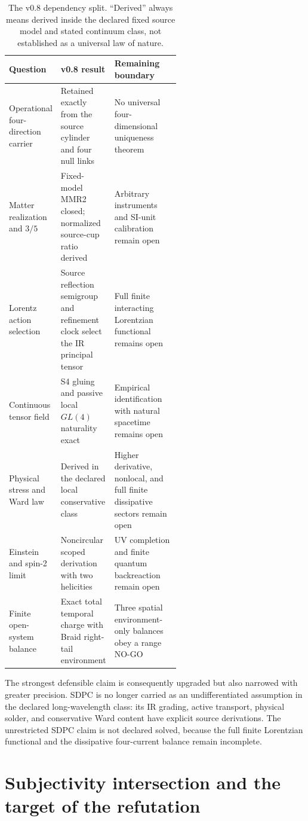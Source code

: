 \documentclass[11pt]{article}
\theoremstyle{definition}
\theoremstyle{remark}
\begin{document}
\begin{table}[ht]
\centering
\small
\begin{tabularx}{\linewidth}{>{\raggedright\arraybackslash}p{0.26\linewidth} >{\raggedright\arraybackslash}p{0.31\linewidth} X}
\toprule
Question & v0.8 result & Remaining boundary \\
\midrule
Operational four-direction carrier & Retained exactly from the source cylinder and four null links & No universal four-dimensional uniqueness theorem \\
Matter realization and $3/5$ & Fixed-model MMR2 closed; normalized source-cup ratio derived & Arbitrary instruments and SI-unit calibration remain open \\
Lorentz action selection & Source reflection semigroup and refinement clock select the IR principal tensor & Full finite interacting Lorentzian functional remains open \\
Continuous tensor field & S4 gluing and passive local $GL(4)$ naturality exact & Empirical identification with natural spacetime remains open \\
Physical stress and Ward law & Derived in the declared local conservative class & Higher derivative, nonlocal, and full finite dissipative sectors remain open \\
Einstein and spin-2 limit & Noncircular scoped derivation with two helicities & UV completion and finite quantum backreaction remain open \\
Finite open-system balance & Exact total temporal charge with Braid right-tail environment & Three spatial environment-only balances obey a range NO-GO \\
\bottomrule
\end{tabularx}
\caption{The v0.8 dependency split. ``Derived'' always means derived inside the declared fixed source model and stated continuum class, not established as a universal law of nature.}
\label{tab:delta}
\end{table}

The strongest defensible claim is consequently upgraded but also narrowed with greater precision. SDPC is no longer carried as an undifferentiated assumption in the declared long-wavelength class: its IR grading, active transport, physical solder, and conservative Ward content have explicit source derivations. The unrestricted SDPC claim is not declared solved, because the full finite Lorentzian functional and the dissipative four-current balance remain incomplete.

\section{Subjectivity intersection and the target of the refutation}
\end{document}
